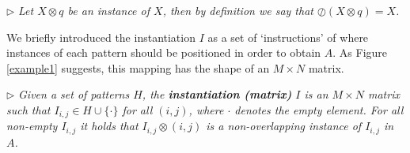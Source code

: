 \documentclass{llncs}
\begin{document}
\smallskip
\noindent $\triangleright$
\emph{Let $X \otimes {q}$ be an instance of $X$, then by definition we say that $\oslash(X \otimes {q}) = X$.}
\smallskip

We briefly introduced the instantiation $I$ as a set of `instructions' of where instances of each pattern should be positioned in order to obtain $A$. As Figure \ref{example1} suggests, this mapping has the shape of an $M\times N$ matrix.

\smallskip
\noindent $\triangleright$
\emph{Given a set of patterns $H$, the \textbf{instantiation (matrix)} ${I}$ is an $M\times N$ matrix such that ${I}_{i,j} \in H \cup \{\cdot\}$ for all $(i,j)$, where $\cdot$ denotes the empty element. For all non-empty ${I}_{i,j}$ it holds that ${I}_{i,j} \otimes (i,j)$ is a non-overlapping instance of ${I}_{i,j}$ in $A$.}

\end{document}
